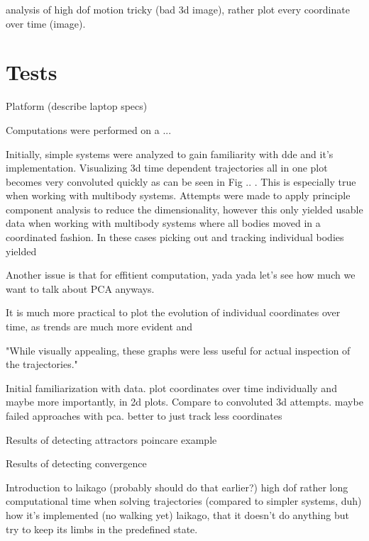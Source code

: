     

    
    analysis of high dof motion tricky (bad 3d image), rather plot every coordinate over time (image). 




    

\section{Tests}
    
    Platform (describe laptop specs)

    Computations were performed on a ...

    Initially, simple systems were analyzed to gain familiarity with dde and it's implementation. Visualizing 3d time dependent trajectories all in one plot becomes very convoluted quickly as can be seen in Fig .. . This is especially true when working with multibody systems. Attempts were made to apply principle component analysis to reduce the dimensionality, however this only yielded usable data when working with multibody systems where all bodies moved in a coordinated fashion. In these cases picking out and tracking individual bodies yielded


    Another issue is that for effitient computation, yada yada let's see how much we want to talk about PCA anyways.  

    It is much more practical to plot the evolution of individual coordinates over time, as trends are much more evident and 

    "While visually appealing, these graphs were less useful for actual inspection of the trajectories."

    Initial familiarization with data.
        plot coordinates over time individually and maybe more importantly, in 2d plots. Compare to convoluted 3d attempts. 
        maybe failed approaches with pca. better to just track less coordinates


    Results of detecting attractors
        poincare example

    Results of detecting convergence

    Introduction to laikago (probably should do that earlier?)
        high dof
        rather long computational time when solving trajectories (compared to simpler systems, duh)
        how it's implemented (no walking yet) laikago, that it doesn't do anything but try to keep its limbs in the predefined state.  

